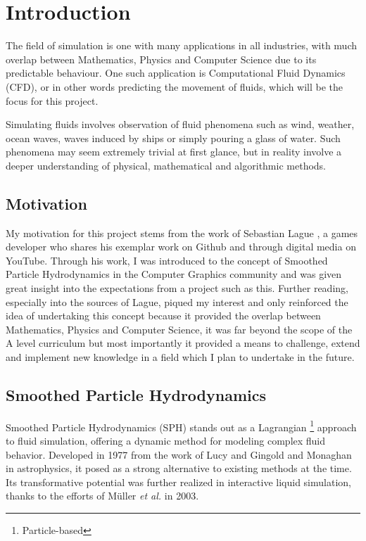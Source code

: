 \documentclass[write-up.tex]{subfiles}
\begin{document}
\section{Introduction}
The field of simulation is one with many applications in all industries, with much overlap between Mathematics, Physics and Computer Science due to its predictable behaviour. One such application is Computational Fluid Dynamics (CFD), or in other words predicting the movement of fluids, which will be the focus for this project.

Simulating fluids involves observation of fluid phenomena such as wind, weather, ocean waves, waves induced by ships or simply pouring a glass of water. Such phenomena may seem extremely trivial at first glance, but in reality involve a deeper understanding of physical, mathematical and algorithmic methods.

\subsection{Motivation}

My motivation for this project stems from the work of Sebastian Lague \cite{Lague}, a games developer who shares his exemplar work on Github and through digital media on YouTube. Through his work, I was introduced to the concept of Smoothed Particle Hydrodynamics in the Computer Graphics community and was given great insight into the expectations from a project such as this. Further reading, especially into the sources of Lague, piqued my interest and only reinforced the idea of undertaking this concept because it provided the overlap between Mathematics, Physics and Computer Science, it was far beyond the scope of the A level curriculum but most importantly it provided a means to challenge, extend and implement new knowledge in a field which I plan to undertake in the future.

\subsection{Smoothed Particle Hydrodynamics}
Smoothed Particle Hydrodynamics (SPH) stands out as a Lagrangian \footnote{Particle-based} approach to fluid simulation, offering a dynamic method for modeling complex fluid behavior. Developed in 1977 from the work of Lucy \cite{lucy} and Gingold and Monaghan \cite{gingold} in astrophysics, it posed as a strong alternative to existing methods at the time. Its transformative potential was further realized in interactive liquid simulation, thanks to the efforts of Müller \textit{et al.} \cite{muller} in 2003.
\end{document}
